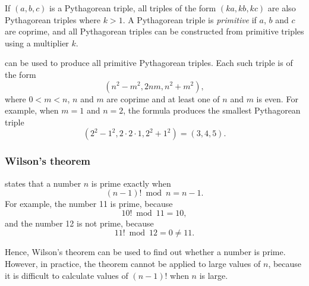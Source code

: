 If $(a,b,c)$ is a Pythagorean triple,
all triples of the form $(ka,kb,kc)$
are also Pythagorean triples where $k>1$.
A Pythagorean triple is \emph{primitive} if
$a$, $b$ and $c$ are coprime,
and all Pythagorean triples can be constructed
from primitive triples using a multiplier $k$.

 can be used to produce
all primitive Pythagorean triples.
Each such triple is of the form
\[(n^2-m^2,2nm,n^2+m^2),\]
where $0<m<n$, $n$ and $m$ are coprime
and at least one of $n$ and $m$ is even.
For example, when $m=1$ and $n=2$, the formula
produces the smallest Pythagorean triple
\[(2^2-1^2,2\cdot2\cdot1,2^2+1^2)=(3,4,5).\]

\subsubsection{Wilson's theorem}


states that a number $n$
is prime exactly when
\[(n-1)! \bmod n = n-1.\]
For example, the number 11 is prime, because
\[10! \bmod 11 = 10,\]
and the number 12 is not prime, because
\[11! \bmod 12 = 0 \neq 11.\]

Hence, Wilson's theorem can be used to find out
whether a number is prime. However, in practice, the theorem cannot be
applied to large values of $n$, because it is difficult
to calculate values of $(n-1)!$ when $n$ is large.


